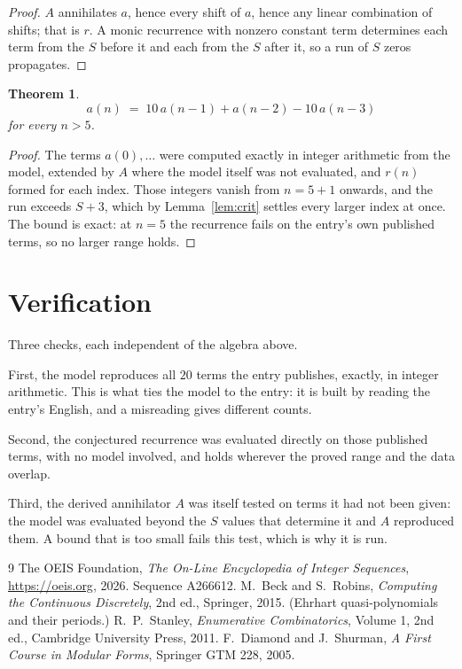 \documentclass[11pt,a4paper]{article}
\theoremstyle{plain}
\newtheorem{theorem}{Theorem}
\theoremstyle{definition}
\begin{document}
\begin{proof}
$A$ annihilates $a$, hence every shift of $a$, hence any linear combination of shifts; that is
$r$. A monic recurrence with nonzero constant term determines each term from the $S$ before it
and each from the $S$ after it, so a run of $S$ zeros propagates.
\end{proof}

\begin{theorem}
\[
a(n)\;=\;10\,a(n-1) + a(n-2) - 10\,a(n-3)
\]
for every $n>5$.
\end{theorem}

\begin{proof}
The terms $a(0),\dots$ were computed exactly in integer arithmetic from the model, extended by
$A$ where the model itself was not evaluated, and $r(n)$ formed for each index. Those integers
vanish from $n=5+1$ onwards, and the run exceeds $S+3$, which by
Lemma~\ref{lem:crit} settles every larger index at once. The bound is exact: at $n=5$ the recurrence fails on the entry's own published terms, so no larger range holds.
\end{proof}

\section{Verification}

Three checks, each independent of the algebra above.

First, the model reproduces all $20$ terms the entry publishes, exactly, in integer
arithmetic. This is what ties the model to the entry: it is built by reading the entry's
English, and a misreading gives different counts.

Second, the conjectured recurrence was evaluated directly on those published terms, with no
model involved, and holds wherever the proved range and the data overlap.

Third, the derived annihilator $A$ was itself tested on terms it had not been given: the model
was evaluated beyond the $S$ values that determine it and $A$ reproduced them. A bound that is
too small fails this test, which is why it is run.

\begin{thebibliography}{9}
 The OEIS Foundation, \emph{The On-Line Encyclopedia of Integer
Sequences}, \url{https://oeis.org}, 2026. Sequence A266612.
 M.~Beck and S.~Robins, \emph{Computing the Continuous Discretely},
2nd ed., Springer, 2015. (Ehrhart quasi-polynomials and their periods.)
 R.~P.~Stanley, \emph{Enumerative Combinatorics}, Volume 1, 2nd ed.,
Cambridge University Press, 2011.
 F.~Diamond and J.~Shurman, \emph{A First Course in Modular Forms},
Springer GTM 228, 2005.
\end{thebibliography}
\end{document}
